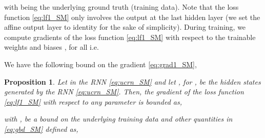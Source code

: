 \documentclass[a4paper]{article}
\newtheorem{proposition}[theorem]{Proposition}
\begin{document}
with  being the underlying ground truth (training data). Note that the loss function \eqref{eq:lf1_SM} only involves the output at the last hidden layer (we set the affine output layer to identity for the sake of simplicity). During training, we compute gradients of the loss function \eqref{eq:lf1_SM} with respect to the trainable weights and biases , for all  i.e.
 
We have the following bound on the gradient \eqref{eq:grad1_SM},
\begin{proposition}
\label{prop:3_SM}
Let  in the RNN \eqref{eq:ucrn_SM} and let , for , be the hidden states generated by the RNN \eqref{eq:ucrn_SM}. Then, the gradient of the loss function  \eqref{eq:lf1_SM} with respect to any parameter  is bounded as,

with , be a bound on the underlying training data and other quantities in \eqref{eq:gbd_SM} defined as,

\end{proposition}
\end{document}
